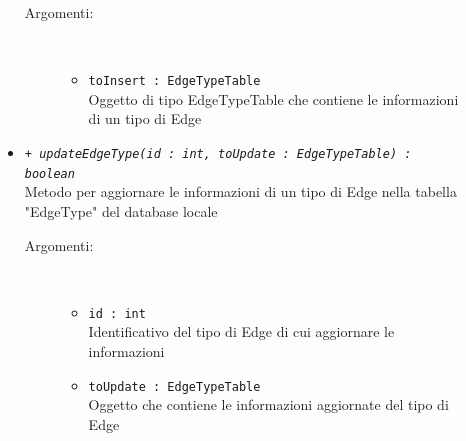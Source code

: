 \documentclass[../DefinizioneDiProdotto.tex]{subfiles}
\begin{document}
\begin{description}
\begin{itemize}
		\begin{description}
			\item[Argomenti:] \
			\begin{itemize}
				\item \texttt{toInsert : EdgeTypeTable}\\
				Oggetto di tipo EdgeTypeTable che contiene le informazioni di un tipo di Edge\end{itemize}
		\end{description}
		\item \texttt{+ \textit{updateEdgeType(id : int, toUpdate : EdgeTypeTable) : boolean}}\\
		Metodo per aggiornare le informazioni di un tipo di Edge nella tabella "EdgeType" del database locale
		\begin{description}
			\item[Argomenti:] \
			\begin{itemize}
				\item \texttt{id : int}\\
				Identificativo del tipo di Edge di cui aggiornare le informazioni\item \texttt{toUpdate : EdgeTypeTable}\\
				Oggetto che contiene le informazioni aggiornate del tipo di Edge\end{itemize}
		\end{description}
	\end{itemize}
\end{description}
\end{document}
